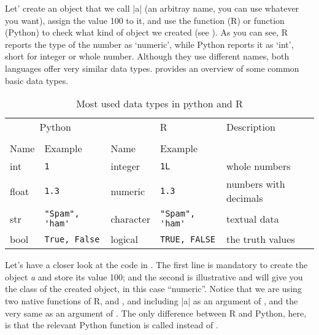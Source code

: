 Let' create an object that we call |a| (an arbitray name, you can use
whatever you want), assign the value 100 to it, and use the 
function (R) or  function (Python) to check what kind of
object we created (see ).
As you can see, R reports the type of the number as `numeric', while Python reports it
as `int', short for integer or whole number.  Although they use
different names, both languages offer very similar data types.
 provides an overview of some common basic data types.


\newcommand{\fndouble}{In R, double and numeric can generally be used
  interchangably (there is a subtle difference, but that is not
  relevant here).}

\begin{table}
  \caption{\label{tab:types}Most used data types in python and R}{
  \begin{tabularx}{\textwidth}{lllll}
    \toprule
    \multicolumn{2}{c}{Python} & \multicolumn{2}{c}{R}& Description \\
    \cmidrule(lr){1-2}    \cmidrule(lr){3-4}\\
    Name & Example & Name & Example \\
    \midrule
    int   & \verb+1+             & integer   & \verb+1L+             & whole numbers \\
    float & \verb+1.3+           & numeric   & \verb+1.3+           & numbers with decimals \\
    str   & \verb+"Spam", 'ham'+ & character & \verb+"Spam", 'ham'+ & textual data  \\ 
    bool  & \verb+True, False+   & logical   & \verb+TRUE, FALSE+   & the truth values \\
    \bottomrule
  \end{tabularx}}{}
\end{table}
    


Let's have a closer look at the code in .
The first line is mandatory to create the object \emph{a} and store
its value 100; and the second is illustrative and will give you the
class of the created object, in this case ``numeric''. Notice that we
are using two native functions of R,  and , and
including |a| as an argument of , and the very same
 as an argument of . The only difference
between R and Python, here, is that the relevant Python function is
called  instead of .

